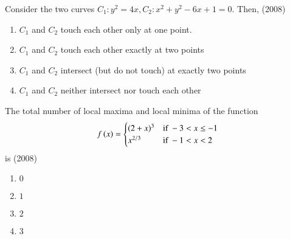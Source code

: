\documentclass[journal,12pt,twocolumn]{IEEEtran}
\theoremstyle{remark}
\begin{document}

   
      \item
	      Consider the two curves $C_{1}:y^2=4x,$$C_{2}:x^2+y^2-6x+1=0.$ Then,  \hfill(2008)
     \begin{enumerate}
      \item $C_{1}$ and $C_{2}$ touch each other only at one point.
    
      \item $C_{1}$ and $C_{2}$ touch each other exactly at two points

      \item $C_{1}$ and $C_{2}$ intersect (but do not touch) at exactly two points

      \item $C_{1}$ and $C_{2}$ neither intersect nor touch each other \\
     
    \end{enumerate}
 
    \item 
    The total number of local maxima and local minima of the function \\
    \begin{align*}
      f\left(x\right)=
      \begin{cases} 
       (2+x)^3 & \text{if } -3<x\le -1\\
       x^{2/3} & \text{if } -1<x<2
      \end{cases}
    \end{align*}is
   \hfill(2008)
    \begin{enumerate}
     \item $0$ 
     \item $1$
     \item $2$ 
     \item $3$ \\
    \end{enumerate}   
\end{document}
